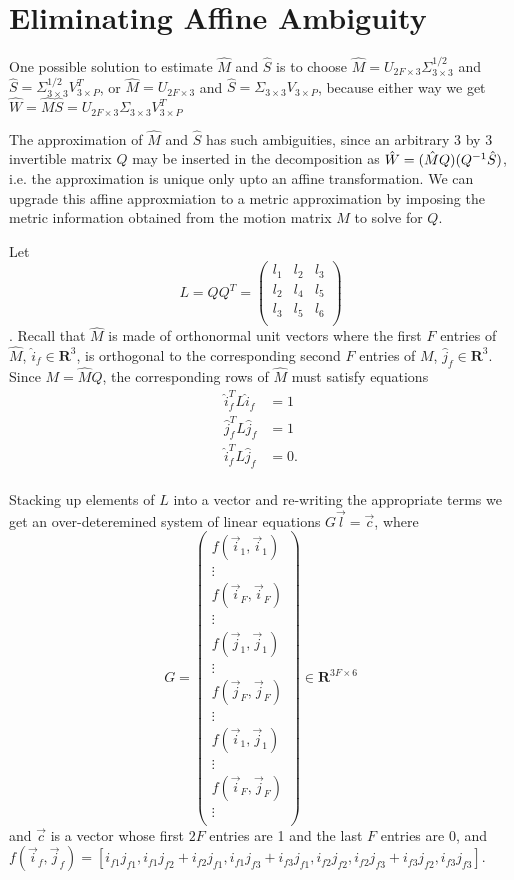 \section{Eliminating Affine Ambiguity}

One possible solution to estimate $\hat M$ and $\hat S$ is to choose
$\hat M = U_{2F\times 3}\Sigma_{3 \times 3}^{1/2}$ and $\hat S =\Sigma_{3 \times 3}^{1/2}V_{3\times P}^T$, or
$\hat M =U_{2F\times 3}$ and $\hat S=\Sigma_{3 \times 3}V_{3\times
  P}$, because either way we get $\hat W = \hat M \hat S = U_{2F\times 3}\Sigma_{3 \times 3} V_{3\times P}^T$

The approximation of $\hat M$ and $\hat S$ has such ambiguities, since
an arbitrary 3 by 3 invertible matrix $Q$ may be inserted in the
decomposition as $\hat W = (\hat M Q) (Q^{-1} \hat S)$, i.e. the
approximation is unique only upto an affine transformation. We can
upgrade this affine approxmiation to a metric approximation by
imposing the metric information obtained from the motion matrix $M$ to
solve for $Q$.

Let $$L = QQ^T =
\begin{pmatrix}
l_1& l_2& l_3\\
l_2& l_4& l_5\\
l_3& l_5& l_6\\
\end{pmatrix}
$$. Recall that $\hat M$ is made of orthonormal unit vectors where the first
$F$ entries of $\hat M$, $\hat i_f\in \mathbf{R}^3$, is orthogonal to the corresponding second $F$
entries of $M$, $\hat j_f \in \mathbf{R}^3$. Since $M = \hat M Q$, the corresponding
rows of $\hat M$ must satisfy equations 
\begin{align*}
  \label{eq:metric}  
  \hat i_f^T L \hat i_f &= 1\\
  \hat j_f^T L \hat j_f &= 1\\
  \hat i_f^T L \hat j_f &= 0.\\
\end{align*}

Stacking up elements of $L$ into a vector and re-writing the appropriate terms
we get an over-deteremined system of linear equations $G\vec l = \vec
c$, where $$
  G = \begin{pmatrix}
    f(\vec i_1, \vec i_1) \\ \vdots \\f(\vec i_F, \vec i_F) \\ \vdots \\
    f(\vec j_1, \vec j_1) \\ \vdots \\    f(\vec j_F, \vec j_F) \\ \vdots \\
    f(\vec i_1, \vec j_1) \\ \vdots \\f(\vec i_F, \vec j_F) \\ \vdots \\
  \end{pmatrix}\in \mathbf{R}^{3F\times 6}$$
 and $\vec c$ is a vector whose first $2F$ entries are 1 and the last
 $F$ entries are 0, and $f(\vec i_f, \vec j_f) = [i_{f1}j_{f1},
 i_{f1}j_{f2}+i_{f2}j_{f1}, i_{f1}j_{f3}+i_{f3}j_{f1}, i_{f2}j_{f2},
 i_{f2}j_{f3}+i_{f3}j_{f2}, i_{f3}j_{f3}]$.

